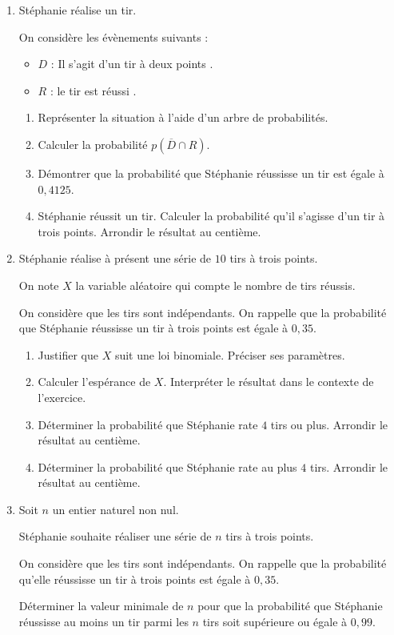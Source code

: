 \begin{enumerate}
	\item Stéphanie réalise un tir. 
	
	On considère les évènements suivants :
	\begin{itemize}
		\item[] $D$ : \og Il s'agit d'un tir à deux points \fg.
		\item[] $R$ : \og le tir est réussi \fg.
	\end{itemize}
	\begin{enumerate}
		\item Représenter la situation à l'aide d'un arbre de probabilités.
		\item Calculer la probabilité $p\left(\overline{D} \cap R\right)$.
		\item Démontrer que la probabilité que Stéphanie réussisse un tir est égale à $0,4125$.
		\item Stéphanie réussit un tir. Calculer la probabilité qu'il s'agisse d'un tir à trois points. Arrondir le résultat au centième.
	\end{enumerate}
	\item Stéphanie réalise à présent une série de $10$ tirs à trois points.
	
	On note $X$ la variable aléatoire qui compte le nombre de tirs réussis.
	
	On considère que les tirs sont indépendants. On rappelle que la probabilité que Stéphanie réussisse un tir à trois points est égale à $0,35$.
	\begin{enumerate}
		\item Justifier que $X$ suit une loi binomiale. Préciser ses paramètres.
		\item Calculer l'espérance de $X$. Interpréter le résultat dans le contexte de l'exercice.
		\item Déterminer la probabilité que Stéphanie rate $4$ tirs ou plus. Arrondir le résultat au centième.
		\item Déterminer la probabilité que Stéphanie rate au plus $4$ tirs. Arrondir le résultat au centième.
	\end{enumerate}	
	\item Soit $n$ un entier naturel non nul.
	
	Stéphanie souhaite réaliser une série de $n$ tirs à trois points. 
	
	On considère que les tirs sont indépendants. On rappelle que la probabilité qu'elle réussisse un tir à trois points est égale à $0,35$.
	
	Déterminer la valeur minimale de $n$ pour que la probabilité que Stéphanie réussisse au moins un tir parmi les $n$ tirs soit supérieure ou égale à $0,99$.
\end{enumerate}

